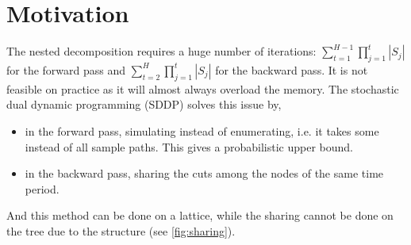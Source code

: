 \documentclass[12pt, openany]{report}
\theoremstyle{definition}
\begin{document}
\section{Motivation}
The nested decomposition requires a huge number of iterations: $\sum_{t=1}^{H-1}\prod_{j=1}^t|S_j|$ for the forward pass and $\sum_{t=2}^H \prod_{j=1}^t |S_j|$ for the backward pass. It is not feasible on practice as it will almost always overload the memory. The stochastic dual dynamic programming (SDDP) solves this issue by,
\begin{itemize}
	\item in the forward pass, simulating instead of enumerating, i.e. it takes some instead of all sample paths. This gives a probabilistic upper bound. 
	\item in the backward pass, sharing the cuts among the nodes of the same time period.
\end{itemize}
And this method can be done on a lattice, while the sharing cannot be done on the tree due to the structure (see \ref{fig:sharing}).
\end{document}
